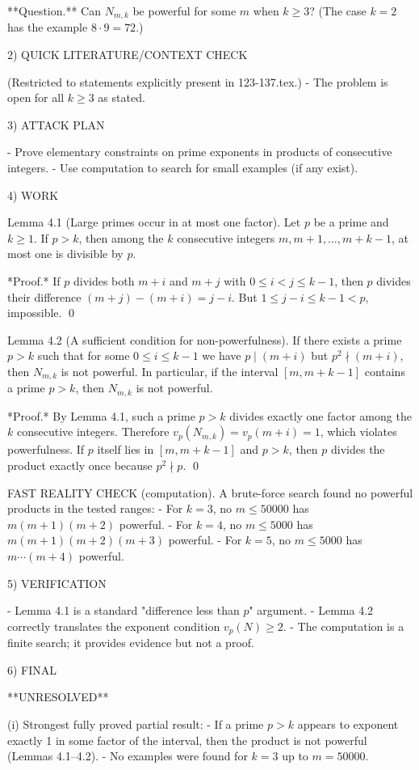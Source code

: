**Question.** Can $N_{m,k}$ be powerful for some $m$ when $k\ge 3$? (The case $k=2$ has the example $8\cdot 9=72$.)

2) QUICK LITERATURE/CONTEXT CHECK

(Restricted to statements explicitly present in 123-137.tex.)
- The problem is open for all $k\ge 3$ as stated.

3) ATTACK PLAN

- Prove elementary constraints on prime exponents in products of consecutive integers.
- Use computation to search for small examples (if any exist).

4) WORK

Lemma 4.1 (Large primes occur in at most one factor).
Let $p$ be a prime and $k\ge 1$.
If $p>k$, then among the $k$ consecutive integers $m,m+1,\dots,m+k-1$, at most one is divisible by $p$.

*Proof.* If $p$ divides both $m+i$ and $m+j$ with $0\le i<j\le k-1$, then $p$ divides their difference $(m+j)-(m+i)=j-i$.
But $1\le j-i\le k-1<p$, impossible. \qed

Lemma 4.2 (A sufficient condition for non-powerfulness).
If there exists a prime $p>k$ such that for some $0\le i\le k-1$ we have $p\mid (m+i)$ but $p^2\nmid (m+i)$, then $N_{m,k}$ is not powerful.
In particular, if the interval $[m,m+k-1]$ contains a prime $p>k$, then $N_{m,k}$ is not powerful.

*Proof.* By Lemma 4.1, such a prime $p>k$ divides exactly one factor among the $k$ consecutive integers.
Therefore $v_p(N_{m,k})=v_p(m+i)=1$, which violates powerfulness.
If $p$ itself lies in $[m,m+k-1]$ and $p>k$, then $p$ divides the product exactly once because $p^2\nmid p$. \qed

FAST REALITY CHECK (computation).
A brute-force search found no powerful products in the tested ranges:
- For $k=3$, no $m\le 50000$ has $m(m+1)(m+2)$ powerful.
- For $k=4$, no $m\le 5000$ has $m(m+1)(m+2)(m+3)$ powerful.
- For $k=5$, no $m\le 5000$ has $m\cdots(m+4)$ powerful.

5) VERIFICATION

- Lemma 4.1 is a standard "difference less than $p$" argument.
- Lemma 4.2 correctly translates the exponent condition $v_p(N)\ge 2$.
- The computation is a finite search; it provides evidence but not a proof.

6) FINAL

**UNRESOLVED**

(i) Strongest fully proved partial result:
- If a prime $p>k$ appears to exponent exactly 1 in some factor of the interval, then the product is not powerful (Lemmas 4.1--4.2).
- No examples were found for $k=3$ up to $m=50000$.

